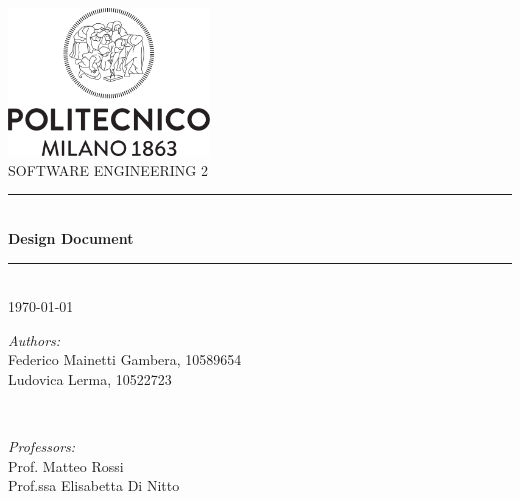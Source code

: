 


        \AddToShipoutPicture*{\BackgroundPic}
        {\color{white}
        \begin{titlepage}
                \center

                \includegraphics[width=0.4\textwidth]{Images/Logo_Politecnico_Milano.png}\\[2cm]

                \textsc{\huge SOFTWARE ENGINEERING 2}\\[0.4cm]

                \newcommand{\HRule}{\rule{\linewidth}{0.10mm}}
                \HRule \\[0.16cm]
                { \Huge \bfseries Design Document}\\[0.14cm]
                \HRule \\ [0.8cm]

                {\Large \today}\\[1cm]

                \vfill
                {\color{black}
                \begin{minipage}{0.59\textwidth}
                        \begin{flushleft} \Large
                                \emph{Authors:}\\
                                Federico Mainetti Gambera, 10589654\\
                                Ludovica Lerma, 10522723\\
                        \end{flushleft}
                \end{minipage}
                        ~
                \begin{minipage}{0.39\textwidth}
                        \begin{flushright} \Large
                                \emph{Professors:}\\
                                Prof. Matteo Rossi \\
                                Prof.ssa Elisabetta Di Nitto \\
                        \end{flushright}
                \end{minipage}\\[1cm]
                }
        \end{titlepage}
        }
